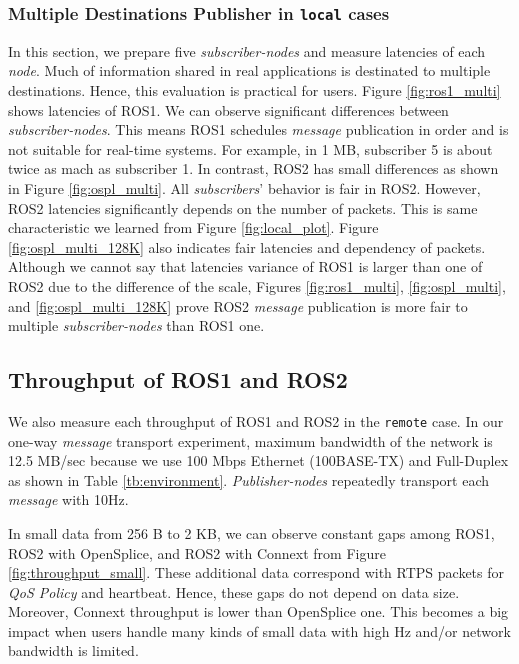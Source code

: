 \documentclass{sig-alternate-05-2015}
\begin{document}
\vspace{-2mm}
\subsubsection{Multiple Destinations Publisher in \texttt{local} cases}
\label{sec:multiple}
In this section, we prepare five \emph{subscriber-nodes} and measure latencies of each \emph{node}.
Much of information shared in real applications is destinated to multiple destinations.
Hence, this evaluation is practical for users.
Figure \ref{fig:ros1_multi} shows latencies of ROS1.
We can observe significant differences between \emph{subscriber-nodes}.
This means ROS1 schedules \emph{message} publication in order and is not suitable for real-time systems.
For example, in 1 MB, subscriber 5 is about twice as mach as subscriber 1.
In contrast, ROS2 has small differences as shown in Figure \ref{fig:ospl_multi}.
All \emph{subscribers}' behavior is fair in ROS2.
However, ROS2 latencies significantly depends on the number of packets.
This is same characteristic we learned from Figure \ref{fig:local_plot}.
Figure \ref{fig:ospl_multi_128K} also indicates fair latencies and dependency of packets.
Although we cannot say that latencies variance of ROS1 is larger than one of ROS2 due to the difference of the scale, Figures \ref{fig:ros1_multi}, \ref{fig:ospl_multi}, and \ref{fig:ospl_multi_128K} prove ROS2 \emph{message} publication is more fair to multiple \emph{subscriber-nodes} than ROS1 one.

\vspace{-2mm}
\subsection{Throughput of ROS1 and ROS2}
\label{sec:throughput}
We also measure each throughput of ROS1 and ROS2 in the \texttt{remote} case.
In our one-way \emph{message} transport experiment, maximum bandwidth of the network is 12.5 MB/sec because we use 100 Mbps Ethernet (100BASE-TX) and Full-Duplex as shown in Table \ref{tb:environment}.
\emph{Publisher-nodes} repeatedly transport each \emph{message} with 10Hz.

In small data from 256 B to 2 KB, we can observe constant gaps among ROS1, ROS2 with OpenSplice, and ROS2 with Connext from Figure \ref{fig:throughput_small}.
These additional data correspond with RTPS packets for \emph{QoS Policy} and heartbeat.
Hence, these gaps do not depend on data size.
Moreover, Connext throughput is lower than OpenSplice one.
This becomes a big impact when users handle many kinds of small data with high Hz and/or network bandwidth is limited.
\end{document}
